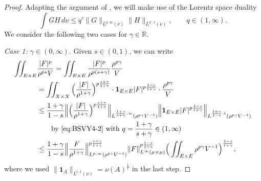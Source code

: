 \documentclass[11pt]{amsart}
\theoremstyle{definition}
\theoremstyle{remark}
\numberwithin{equation}{section}
\newcommand{\Norm}[2]{\|#1\|_{#2}}
\newcommand{\BNorm}[2]{\Big\|#1\Big\|_{#2}}
\begin{document}
\begin{proof}%
Adapting the argument of \cite[page 963]{BSVY}, we will make use of the Lorentz space
duality \cite[(4-2)]{BSVY}
\begin{equation}\label{eq:BSVY4-2}
  \int GH\,d\nu
  \leq q'\Norm{G}{L^{q,\infty}(\nu)}\Norm{H}{L^{q',1}(\nu)},\qquad q\in(1,\infty).
\end{equation}
We consider the following two cases for $\gamma\in\mathbb{R}$.

\emph{Case 1: $\gamma\in(0,\infty)$}. Given $s\in(0,1)$, we can write
\begin{equation}
\begin{split}
  \iint_{E\times E} &
     \frac{|F|^p}{\rho^{ps}V}
  =\iint_{E\times E}
     \frac{|F|^p}{\rho^{p(s+\gamma)}}\frac{\rho^{p\gamma}}{V}    \\
  &=\iint_{X\times X}\Big(\frac{|F|}{\rho^{1+\gamma}}\Big)^{p\frac{s+\gamma}{1+\gamma}}
  \cdot\mathbf{1}_{E\times E}|F|^{p\frac{1-s}{1+\gamma}}
  \cdot\frac{\rho^{p\gamma}}{V} \\
  &\leq\frac{1+\gamma}{1-s}
  \BNorm{\Big(\frac{|F|}{\rho^{1+\gamma}}\Big)^{p\frac{s+\gamma}{1+\gamma} }}{
  L^{\frac{1+\gamma}{s+\gamma},\infty} (\rho^{p\gamma}V^{-1})}
  \BNorm{\mathbf{1}_{E\times E}|F|^{p\frac{1-s}{1+\gamma}} }{
  L^{\frac{1+\gamma}{1-s},1}( \rho^{p\gamma} V^{-1} ) } \\
  &\qquad\text{by \eqref{eq:BSVY4-2} with }q=\frac{1+\gamma}{s+\gamma}\in(1,\infty) \\
  &\leq\frac{1+\gamma}{1-s}
  \BNorm{ \frac{F}{\rho^{1+\gamma}} }{   L^{p,\infty} (\rho^{p\gamma}V^{-1})
  }^{p\frac{s+\gamma}{1+\gamma}}
  \Norm{F}{L^\infty(\mu\times\mu)}^{p\frac{1-s}{1+\gamma}}
  \Big(\iint_{E\times E}\rho^{p\gamma}V^{-1}\Big)^{\frac{1-s}{1+\gamma}},
\end{split}\label{eq:BSVY963}
\end{equation}
where we used $\Norm{\mathbf{1}_A}{L^{r,1}(\nu)}=\nu(A)^{\frac1r}$ in the last step.


\end{proof}
\end{document}
